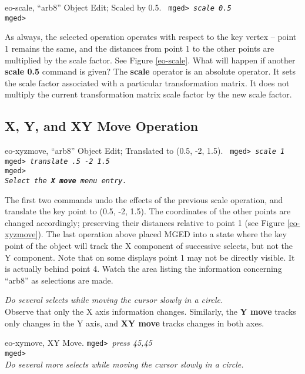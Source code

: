 \mfig eo-scale, ``arb8'' Object Edit; Scaled by 0.5.
\noindent
{\tt
mged> {\em scale 0.5}\\
mged>\\
}

As always, the selected operation operates with respect to the key
vertex -- point 1 remains the same, and the distances from point 1 to
the other points are multiplied by the scale factor.  See Figure
\ref{eo-scale}.  What will happen if another {\bf scale 0.5} command
is given?  The {\bf scale} operator is an absolute operator.  It sets
the scale factor associated with a particular transformation matrix.
It does not multiply the current transformation matrix scale factor by
the new scale factor.

\subsection{X, Y, and XY Move Operation}

\mfig eo-xyzmove, ``arb8'' Object Edit; Translated to (0.5, -2, 1.5).
\noindent
{\tt
mged> {\em scale 1}\\
mged> {\em translate .5 -2 1.5}\\
mged>\\
{\em Select the {\bf X move} menu entry.}\\
}

The first two commands undo the effects of the previous scale operation, and
translate the key point to (0.5, -2, 1.5).  The coordinates of the other
points are changed accordingly; preserving their distances relative
to point 1 (see Figure \ref{eo-xyzmove}).
The last operation above placed MGED into a state where the key point
of the object will track the X component of successive selects, but not the Y
component. Note that on some displays point 1 may not be directly
visible.  It is actually behind point 4. Watch the area listing the
information concerning ``arb8'' as selections are made.

\noindent
{\em Do several selects while moving the cursor slowly in a circle.}\\

   Observe that only the X axis information changes. Similarly, the {\bf
Y move} tracks only changes in the Y axis, and {\bf XY move} tracks
changes in both axes.

\mfig eo-xymove, XY Move.
\noindent
{\tt mged> }{\em press 45,45}\\
{\tt mged> }\\
{\em Do several more selects while moving the cursor slowly in a circle.}\\

